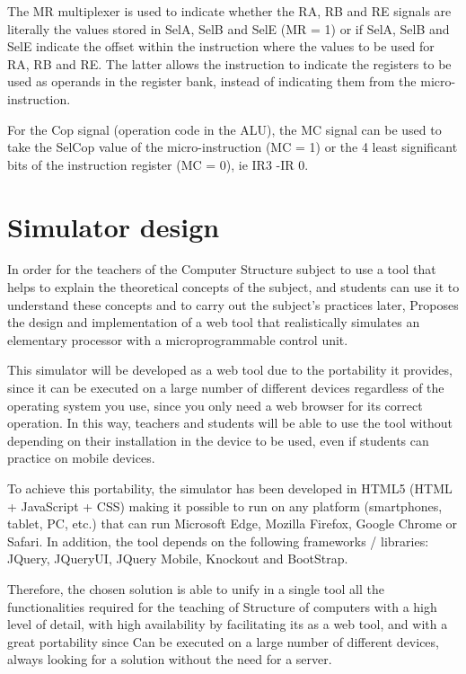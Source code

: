 The MR multiplexer is used to indicate whether the RA, RB and RE signals are literally the values stored in SelA, SelB and SelE (MR = 1) or if SelA, SelB and SelE indicate the offset within the instruction where the values to be used for RA, RB and RE. The latter allows the instruction to indicate the registers to be used as operands in the register bank, instead of indicating them from the micro-instruction.

For the Cop signal (operation code in the ALU), the MC signal can be used to take the SelCop value of the micro-instruction (MC = 1) or the 4 least significant bits of the instruction register (MC = 0), ie IR3 -IR 0.

\section*{Simulator design}

In order for the teachers of the Computer Structure subject to use a tool that helps to explain the theoretical concepts of the subject, and students can use it to understand these concepts and to carry out the subject's practices later, Proposes the design and implementation of a web tool that realistically simulates an elementary processor with a microprogrammable control unit.

This simulator will be developed as a web tool due to the portability it provides, since it can be executed on a large number of different devices regardless of the operating system you use, since you only need a web browser for its correct operation. In this way, teachers and students will be able to use the tool without depending on their installation in the device to be used, even if students can practice on mobile devices.

To achieve this portability, the simulator has been developed in HTML5 (HTML + JavaScript + CSS) making it possible to run on any platform (smartphones, tablet, PC, etc.) that can run Microsoft Edge, Mozilla Firefox, Google Chrome or Safari. In addition, the tool depends on the following frameworks / libraries: JQuery, JQueryUI, JQuery Mobile, Knockout and BootStrap.

Therefore, the chosen solution is able to unify in a single tool all the functionalities required for the teaching of Structure of computers with a high level of detail, with high availability by facilitating its as a web tool, and with a great portability since Can be executed on a large number of different devices, always looking for a solution without the need for a server.

